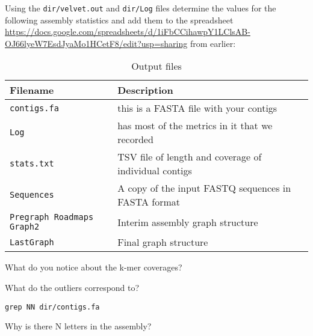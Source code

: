 Using the \texttt{dir/velvet.out} and \texttt{dir/Log} files determine the values for the following assembly statistics and add them to the spreadsheet \url{https://docs.google.com/spreadsheets/d/1iFbCCihawpY1LClsAB-OJ66lyeW7EsdJyaMo1HCetF8/edit?usp=sharing} from earlier:
\begin{table}[H]
  \centering
  \caption{Output files}
    \begin{tabular}{ll}
    \toprule
    \textbf{Filename} & \textbf{Description} \\
    \midrule
    \texttt{contigs.fa} & this is a FASTA file with your contigs \\
    \texttt{Log} & has most of the metrics in it that we recorded \\
	\texttt{stats.txt} & TSV file of length and coverage of individual contigs \\ 
	\texttt{Sequences} & A copy of the input FASTQ sequences in FASTA format \\ 
	\texttt{Pregraph Roadmaps Graph2} & Interim assembly graph structure \\ 
	\texttt{LastGraph} & Final graph structure
    \bottomrule
    \end{tabular}
  \label{tab:velvet_out}
\end{table}


\begin{questions}
What do you notice about the k-mer coverages?
\begin{answer}
\end{answer}
What do the outliers correspond to?
\begin{answer}
\end{answer}
\end{questions}

\begin{steps}
\begin{lstlisting}
grep NN dir/contigs.fa
\end{lstlisting}
\end{steps}

\begin{questions}
Why is there N letters in the assembly?
\begin{answer}
\end{answer}
\end{questions}


